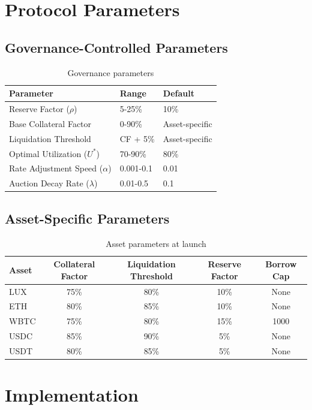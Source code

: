 \documentclass[11pt,a4paper]{article}
\begin{document}
\section{Protocol Parameters}

\subsection{Governance-Controlled Parameters}

\begin{table}[h]
\centering
\begin{tabular}{@{}lll@{}}
\toprule
Parameter & Range & Default \\
\midrule
Reserve Factor ($\rho$) & 5-25\% & 10\% \\
Base Collateral Factor & 0-90\% & Asset-specific \\
Liquidation Threshold & CF + 5\% & Asset-specific \\
Optimal Utilization ($U^*$) & 70-90\% & 80\% \\
Rate Adjustment Speed ($\alpha$) & 0.001-0.1 & 0.01 \\
Auction Decay Rate ($\lambda$) & 0.01-0.5 & 0.1 \\
\bottomrule
\end{tabular}
\caption{Governance parameters}
\label{tab:params}
\end{table}

\subsection{Asset-Specific Parameters}

\begin{table}[h]
\centering
\begin{tabular}{@{}lcccc@{}}
\toprule
Asset & Collateral Factor & Liquidation Threshold & Reserve Factor & Borrow Cap \\
\midrule
LUX & 75\% & 80\% & 10\% & None \\
ETH & 80\% & 85\% & 10\% & None \\
WBTC & 75\% & 80\% & 15\% & 1000 \\
USDC & 85\% & 90\% & 5\% & None \\
USDT & 80\% & 85\% & 5\% & None \\
\bottomrule
\end{tabular}
\caption{Asset parameters at launch}
\label{tab:assets}
\end{table}

\section{Implementation}
\end{document}
